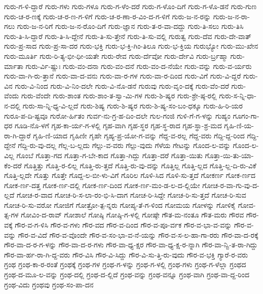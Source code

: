 {ಗುರು-ಗ-ಳಿ-ದ್ದಾರೆ
ಗುರು-ಗಳು
ಗುರು-ಗಳೂ
ಗುರು-ಗ-ಳೆಂ-ದರೆ
ಗುರು-ಗ-ಳೊಂ-ದಿಗೆ
ಗುರು-ಗ-ಳೊ-ಡನೆ
ಗುರು-ಗುಣ
ಗುರು-ಚ-ರ-ಣಕ್ಕೆ
ಗುರು-ಚ-ರ-ಣ-ಗ-ಳಿಗೆ
ಗುರು-ಚ-ರ-ಣಾ-ರ-ವಿಂ-ದ-ಗ-ಳಿಗೆ
ಗುರು-ಜ-ನ-ರನ್ನು
ಗುರು-ಜ-ನ-ರಾ-ಗಲು
ಗುರು-ಜ-ನ-ರಿಗೆ
ಗುರು-ಜ-ನ-ರೊಂ-ದಿಗೆ
ಗುರು-ಜ್ಞಾನ
ಗುರು-ತ-ರ-ವಾ-ದದ್ದು
ಗುರು-ತಿ-ಸಲು
ಗುರು-ತಿಸಿ
ಗುರು-ತಿ-ಸಿ-ದ್ದಾರೆ
ಗುರು-ತಿ-ಸಿ-ದ್ದೇನೆ
ಗುರು-ತಿ-ಸು-ತ್ತೇನೆ
ಗುರು-ತಿ-ಸು-ವಲ್ಲಿ
ಗುರುತ್ವ
ಗುರು-ದೆವ
ಗುರು-ದೇ-ವಾತ್
ಗುರು-ಪ್ರ-ಸಾದ
ಗುರು-ಪ್ರ-ಸಾ-ದರ
ಗುರು-ಭಕ್ತಿ
ಗುರು-ಭ-ಕ್ತಿ-ಗಿಂ-ತಿಲೂ
ಗುರು-ಭ-ಕ್ತಿಯ
ಗುರುಭ್ಯೋ
ಗುರು-ಮು-ಖೇನ
ಗುರು-ಮೂರ್ತಿ
ಗುರು-ರಿ-ತ್ಯ-ಭೀ-ಧೀ-ಯತೇ
ಗುರು-ರೇವ
ಗುರು-ರ್ದೆವೋ
ಗುರು-ರ್ದೇವಿ
ಗುರು-ರ್ಬ್ರಹ್ಮಾ
ಗುರು-ರ್ಮಾತಾ
ಗುರು-ರ್ವಿ-ಷ್ಣುಃ
ಗುರು-ವಂ-ದನಾ
ಗುರು-ವಂ-ದನೆ
ಗುರು-ವಂ-ದ-ನೆಯೇ
ಗುರು-ವನ್ನು
ಗುರು-ವ-ರ್ಯರು
ಗುರು-ವಾ-ಗಿ-ರು-ತ್ತಾನೆ
ಗುರು-ವಾ-ದ-ವನು
ಗುರು-ವಾ-ರ-ಗಳ
ಗುರು-ವಾ-ರ-ದಿಂದ
ಗುರು-ವಿಗೆ
ಗುರು-ವಿ-ದ್ದರೆ
ಗುರು-ವಿನ
ಗುರು-ವಿ-ನಿಂದ
ಗುರು-ವಿ-ನಿಂ-ದಲೇ
ಗುರು-ವಿ-ನೊ-ಡನೆ
ಗುರುವು
ಗುರು-ವೃಂ-ದಕ್ಕೆ
ಗುರು-ವೆಂ-ದರೆ
ಗುರು-ವೆಂದು
ಗುರು-ವೆಂದೇ
ಗುರು-ಶಾಂತ
ಗುರು-ಶಾಂ-ತ-ಸ್ವಾ-ಮಿ-ಗಳ
ಗುರು-ಶಿ-ಷ್ಯರ
ಗುರು-ಶ್ರೇ-ಷ್ಠ-ರಲ್ಲಿ
ಗುರು-ಸ-ನ್ನಿ-ಧಾ-ನ-ದಲ್ಲಿ
ಗುರು-ಸಾ-ನ್ನಿ-ಧ್ಯ-ವಿ-ಲ್ಲದೆ
ಗುರು-ಶಿಷ್ಯ
ಗುರು-ಶಿ-ಷ್ಯರ
ಗುರು-ಶಿ-ಷ್ಯ-ಸಂ-ಬಂ-ಧಕ್ಕೂ
ಗುರು-ಹಿ-ರಿ-ಯರ
ಗುರೂ-ಪ-ದಿ-ಷ್ಟವೂ
ಗುರೋ-ರ್ಹಿತಂ
ಗುರ್ವ-ನು-ಗ್ರ-ಹ-ದಿಂ-ದಲೇ
ಗುಲ-ಗಂಜಿ
ಗುಳಿ-ಗೆ-ಗ-ಳನ್ನು
ಗುಹ್ಯಂ
ಗೂಗಂ-ಗಾ-ಧರ
ಗೂಡಿ-ನೊ-ಳಗೆ
ಗೃಹ-ಕಾ-ರ್ಯ-ಗ-ಳಲ್ಲಿ
ಗೃಹ-ವಾಗಿ
ಗೃಹ-ಸ್ಥರ
ಗೃಹ-ಸ್ಥ-ರಾದ
ಗೃಹ-ಸ್ಥಾ-ಶ್ರ-ಮದ
ಗೃಹಿ-ಣಿ-ಯ-ರಾ-ಗಿ-ದ್ದಾರೆ
ಗೃಹಿ-ಣಿ-ಯಾದ
ಗೃಹಿಣೀ
ಗೃಹೇ
ಗೃಹ್ಯ-ಪ್ರ-ಯೋ-ಗ-ವನ್ನು
ಗೆದ್ದ-ವ-ರಲ್ಲ
ಗೆದ್ದ-ವರು
ಗೆದ್ದಿ-ದ್ದ-ರಿಂದ
ಗೆದ್ದಿ-ದ್ದೇನೆ
ಗೆದ್ದಿ-ರು-ವು-ದಲ್ಲ
ಗೆಲ್ಲ-ಬ-ಲ್ಲದು
ಗೆಲ್ಲು-ವ-ವರು
ಗೆಲ್ಲು-ವುದು
ಗೆಳೆಯ
ಗೇಟನ್ನು
ಗೊಂದ-ಲ-ವನ್ನು
ಗೊಂದ-ಲ-ವಿಲ್ಲ
ಗೊಂಬೆ
ಗೊತ್ತಾ-ಗದ
ಗೊತ್ತಾ-ಗ-ಬೇ-ಕಾದ
ಗೊತ್ತಾ-ಗಿದ್ದು
ಗೊತ್ತಾ-ದರೆ
ಗೊತ್ತಾ-ಯಿತು
ಗೊತ್ತಾ-ಯಿ-ತು-ಯಾ-ಕೆಂ-ದರೆ
ಗೊತ್ತಿತ್ತು
ಗೊತ್ತಿ-ರ-ಲಿಲ್ಲ
ಗೊತ್ತಿ-ರು-ತ್ತದೆ
ಗೊತ್ತಿ-ರು-ವು-ದನ್ನು
ಗೊತ್ತಿಲ್ಲ
ಗೊತ್ತಿ-ಲ್ಲದ
ಗೊತ್ತಿ-ಲ್ಲ-ದಿ-ರು-ವಿಕೆ
ಗೊತ್ತಿ-ಲ್ಲದೇ
ಗೊತ್ತು
ಗೊತ್ತೇ
ಗೊದ್ದ-ಲ-ಬೀ-ಳು-ವಿಗೆ
ಗೊರಿಲ
ಗೊಳಿ-ಸಿದ
ಗೊಳಿ-ಸು-ತ್ತದೆ
ಗೋಕರ್ಣ
ಗೋಕ-ರ್ಣದ
ಗೋಕ-ರ್ಣ-ದತ್ತ
ಗೋಕ-ರ್ಣ-ದಲ್ಲಿ
ಗೋಕ-ರ್ಣ-ದಿಂದ
ಗೋಕ-ರ್ಣ-ಮಂ-ಡ-ಲ-ದ-ಲ್ಲಿಯೇ
ಗೋಚ-ರ-ವಾ-ಗು-ವು-ದ-ಲ್ಲದೆ
ಗೋಚ-ರ-ವಾದ
ಗೋಚ-ರಿ-ಸ-ಲಾ-ರಂ-ಭಿ-ಸಿ-ದಾಗ
ಗೋಚ-ರಿ-ಸಿದ್ದೇ
ಗೋಚ-ರಿ-ಸು-ತ್ತದೆ
ಗೋಚ-ರಿ-ಸುವ
ಗೋಚ-ರಿ-ಸು-ವರೋ
ಗೋಜಿಗೆ
ಗೋತ್ರೋ-ತ್ಪ-ನ್ನರು
ಗೋಪ್ಯ-ತೆ-ಗ-ಳಿಂದ
ಗೋಮಯ
ಗೋಳನ್ನು
ಗೋಳಿಕೈ
ಗೋವ-ತ್ಸ-ಗಳ
ಗೋವಿಂ-ದ-ರಾವ್
ಗೋಶಾಲೆ
ಗೋಷ್ಠಿ
ಗೋಷ್ಠಿ-ಗ-ಳಲ್ಲಿ
ಗೋಷ್ಠೇ
ಗೌತ-ಮ-ನಂತೂ
ಗೌತ-ಮರು
ಗೌರವ
ಗೌರ-ವಕ್ಕೆ
ಗೌರ-ವ-ಗ-ಳಿಸಿ
ಗೌರ-ವ-ಗಳು
ಗೌರ-ವದ
ಗೌರ-ವ-ದಿಂದ
ಗೌರ-ವ-ಪೂ-ರ್ವಕ
ಗೌರ-ವ-ಭಾ-ವ-ವನ್ನು
ಗೌರ-ವ-ವನ್ನು
ಗೌರ-ವ-ವಿದೆ
ಗೌರ-ವ-ವೊಂದೇ
ಗೌರ-ವ-ಸಂ-ಭಾ-ವ-ನೆ-ಯನ್ನು
ಗೌರ-ವ-ಸ-ಲ-ಹಾ-ಗಾ-ರರು
ಗೌರ-ವಾ-ದ-ರಕ್ಕೆ
ಗೌರ-ವಾ-ದ-ರ-ಗ-ಳನ್ನು
ಗೌರ-ವಾ-ದ-ರ-ಗಳು
ಗೌರ-ವಾ-ಧ್ಯ-ಕ್ಷರ
ಗೌರ-ವಾ-ಧ್ಯ-ಕ್ಷ-ರ-ನ್ನಾಗಿ
ಗೌರ-ವಾ-ನ್ವಿ-ತ-ರಾ-ಗಿದ್ದು
ಗೌರ-ವಾ-ರ್ಹ-ರಾ-ಗಿ-ದ್ದ-ವರು
ಗೌರ-ವಿಸಿ
ಗೌರ-ವಿ-ಸಿದ್ದು
ಗೌರ-ವಿ-ಸು-ತ್ತಿ-ರು-ವುದು
ಗೌರ-ವ-ಭಕ್ತಿ
ಗ್ಯಾರೆ-ರ-ವರು
ಗ್ರಂಥ
ಗ್ರಂಥ-ಕಾ-ರ-ರಂತೆ
ಗ್ರಂಥಕ್ಕೆ
ಗ್ರಂಥ-ಗಳ
ಗ್ರಂಥ-ಗ-ಳನ್ನು
ಗ್ರಂಥ-ಗ-ಳಲ್ಲಿ
ಗ್ರಂಥ-ಗಳು
ಗ್ರಂಥ-ಗ-ಳೆಲ್ಲಾ
ಗ್ರಂಥದ
ಗ್ರಂಥ-ದ-ಮೂ-ಲ-ವನ್ನು
ಗ್ರಂಥ-ದಲ್ಲಿ
ಗ್ರಂಥ-ದ-ಲ್ಲಿದೆ
ಗ್ರಂಥ-ವನ್ನು
ಗ್ರಂಥ-ವನ್ನೂ
ಗ್ರಂಥ-ವಾಗಿ
ಗ್ರಂಥ-ವಾ-ದ್ದ-ರಿಂದ
ಗ್ರಂಥ-ವಿದು
ಗ್ರಂಥವು
ಗ್ರಂಥ-ಸಂ-ಪಾ-ದನ
}
